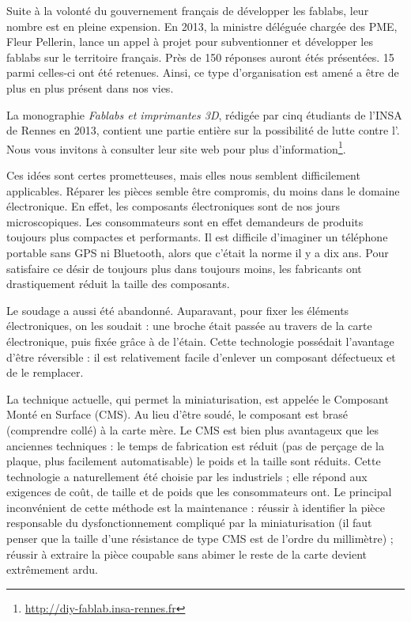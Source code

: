 \medbreak

Suite à la volonté du gouvernement français de développer les fablabs, leur nombre est en pleine expension. En 2013, la ministre déléguée chargée des PME, Fleur Pellerin, lance un appel à projet pour subventionner et développer les fablabs sur le territoire français. Près de 150 réponses auront étés présentées. 15 parmi celles-ci ont été retenues. Ainsi, ce type d'organisation est amené a être de plus en plus présent dans nos vies. 

La monographie \textit{Fablabs et imprimantes 3D}, rédigée par cinq étudiants de l'INSA de Rennes en 2013, contient une partie entière sur la possibilité de lutte contre l'\op. Nous vous invitons à consulter leur site web pour plus d'information\footnote{\url{http://diy-fablab.insa-rennes.fr}}.


\bigbreak 

Ces idées sont certes prometteuses, mais elles nous semblent difficilement applicables. Réparer les pièces semble être compromis, du moins dans le domaine électronique. En effet, les composants électroniques sont de nos jours microscopiques. Les consommateurs sont en effet demandeurs de produits toujours plus compactes et performants. Il est difficile d'imaginer un téléphone portable sans GPS ni Bluetooth, alors que c'était la norme il y a dix ans. Pour satisfaire ce désir de toujours plus dans toujours moins, les fabricants ont drastiquement réduit la taille des composants. 

Le soudage a aussi été abandonné. Auparavant, pour fixer les éléments électroniques, on les soudait : une broche était passée au travers de la carte électronique, puis fixée grâce à de l'étain. Cette technologie possédait l'avantage d'être réversible : il est relativement facile d'enlever un composant défectueux et de le remplacer. 

La technique actuelle, qui permet la miniaturisation, est appelée le Composant Monté en Surface (CMS). Au lieu d'être soudé, le composant est brasé (comprendre collé) à la carte mère. Le CMS est bien plus avantageux que les anciennes techniques : le temps de fabrication est réduit (pas de perçage de la plaque, plus facilement automatisable) le poids et la taille  sont réduits. Cette technologie a naturellement été choisie par les industriels ; elle répond aux exigences de coût, de taille et de poids que les consommateurs ont.
\smallbreak
Le principal inconvénient de cette méthode est la maintenance : réussir à identifier la pièce responsable du dysfonctionnement compliqué par la miniaturisation (il faut penser que la taille d'une résistance de type CMS est de l'ordre du millimètre) ; réussir à extraire la pièce coupable sans abimer le reste de la carte devient extrêmement ardu. 

